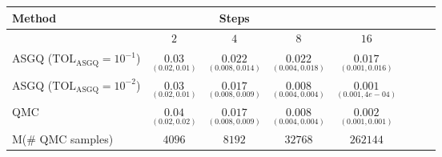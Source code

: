 \begin{table}[h!]
	\begin{small}
		\centering
		\begin{tabular}{l*{6}{c}r}
			\toprule[1.5pt]
			Method & & Steps  & &     \\
			\hline		
			& $2$ & $4$ & $8$ & $16$  \\
			\hline
			ASGQ ($\text{TOL}_{\text{ASGQ}}=10^{-1}$)  &  $\underset{(0.02,0.01)}{\mathbf{0.03}}$ & $\underset{(0.008,0.014)}{\mathbf{0.022}}$& $\underset{(0.004,0.018)}{\mathbf{ 0.022}}$ & $\underset{(0.001,0.016)}{\mathbf{ 0.017}}$   \\
			
			ASGQ ($\text{TOL}_{\text{ASGQ}}=10^{-2}$)  &  $\underset{(0.02,0.01)}{\mathbf{0.03}}$ & $\underset{(0.008,0.009)}{\mathbf{0.017}}$& $\underset{(0.004,0.004)}{\mathbf{ 0.008}}$ & $\underset{(0.001,4e-04)}{\mathbf{ 0.001}}$  \\
			\hline
			QMC   & $\underset{(0.02,0.02)}{\mathbf{0.04}}$  &  $\underset{(0.008,0.009)}{\mathbf{0.017}}$  & $\underset{(0.004,0.004)}{\mathbf{0.008}}$ & $\underset{(0.001,0.001)}{\mathbf{0.002}}$  \\	
			M(\# QMC samples) 	& $4096$  &  $8192$  & $32768$ & $262144$ \\
			

\end{tabular}
\end{small}
\end{table}
